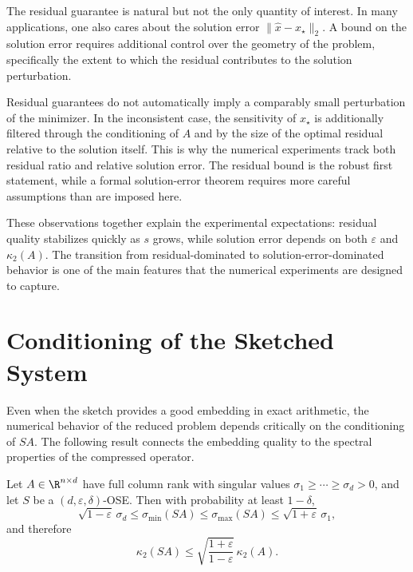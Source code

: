 The residual guarantee is natural but not the only quantity of interest. In many applications, one also cares about the solution error \(\|\hat x - x_\star\|_2\). A bound on the solution error requires additional control over the geometry of the problem, specifically the extent to which the residual contributes to the solution perturbation.

\begin{remark}
	Residual guarantees do not automatically imply a comparably small perturbation
	of the minimizer. In the inconsistent case, the sensitivity of \(x_\star\) is
	additionally filtered through the conditioning of \(A\) and by the size of the
	optimal residual relative to the solution itself. This is why the numerical
	experiments track both residual ratio and relative solution error. The residual
	bound is the robust first statement, while a formal solution-error theorem
	requires more careful assumptions than are imposed here.
\end{remark}

These observations together explain the experimental expectations: residual
quality stabilizes quickly as \(s\) grows, while solution error depends on both
\(\varepsilon\) and \(\kappa_2(A)\). The transition from residual-dominated to
solution-error-dominated behavior is one of the main features that the numerical
experiments are designed to capture.

\section{Conditioning of the Sketched System}

Even when the sketch provides a good embedding in exact arithmetic, the numerical behavior of the reduced problem depends critically on the conditioning of \(SA\). The following result connects the embedding quality to the spectral properties of the compressed operator.

\begin{proposition} \label{prop:sketched_cond}
	Let \(A \in \R^{n \times d}\) have full column rank with singular values \(\sigma_1 \ge \cdots \ge \sigma_d > 0\), and let \(S\) be a \((d,\varepsilon,\delta)\)-OSE. Then with probability at least \(1 - \delta\),
	\[
		\sqrt{1-\varepsilon}\,\sigma_d \le \sigma_{\min}(SA) \le \sigma_{\max}(SA) \le \sqrt{1+\varepsilon}\,\sigma_1,
	\]
	and therefore
	\[
		\kappa_2(SA) \le \sqrt{\frac{1+\varepsilon}{1-\varepsilon}}\,\kappa_2(A).
	\]
\end{proposition}

